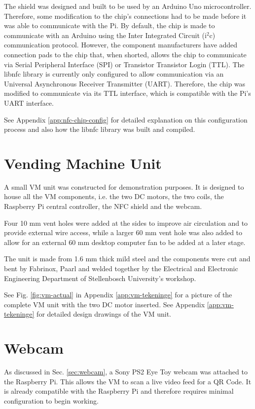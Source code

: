 The shield was designed and built to be used by an Arduino Uno microcontroller.
Therefore, some modification to the chip's connections had to be made before it
was able to communicate with the Pi. By default, the chip is made to communicate
with an Arduino using the Inter Integrated Circuit (i$^2$c) communication protocol. However, the
component manufacturers have added connection pads to the chip that, when shorted, allows
the chip to communicate via Serial Peripheral Interface (SPI) or Transistor
Transistor Login (TTL). The libnfc library is currently only configured to allow
communication via an Universal Asynchronous Receiver Transmitter (UART). Therefore, the
chip was modified to communicate via its TTL interface, which is compatible with the Pi's
UART interface. 

See Appendix \ref{app:nfc-chip-config} for detailed explanation on this
configuration process and also how the libnfc library was built and compiled. 

\section{Vending Machine Unit}

A small VM unit was constructed for demonstration purposes. It is
designed to house all the VM components, i.e. the two DC motors,
the two coils, the Raspberry Pi central controller, the NFC shield and the
webcam.

Four 10 mm vent holes were added at the sides to improve air circulation
and to provide external wire access, while a larger 60 mm vent hole was also
added to allow for an external 60 mm desktop computer fan to be added at a
later stage.

The unit is made from 1.6 mm thick mild steel and the components were cut and
bent by Fabrinox, Paarl and welded together by the Electrical and Electronic
Engineering Department of Stellenbosch University's workshop.

See Fig. \ref{fig:vm-actual} in Appendix \ref{app:vm-tekeninge} for a picture of the
complete VM unit with the two DC motor inserted. See Appendix \ref{app:vm-tekeninge} for
detailed design drawings of the VM unit.

\section{Webcam}

As discussed in Sec. \ref{sec:webcam}, a Sony PS2 Eye Toy  webcam was
attached to the Raspberry Pi. This allows the VM to scan a live
video feed for a QR Code. It is already compatible with the Raspberry Pi and
therefore requires minimal configuration to begin working.

